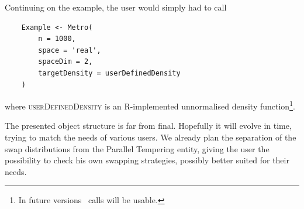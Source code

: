 Continuing on the example, the user would simply had to call

\begin{lstlisting}
	Example <- Metro(
		n = 1000,
		space = 'real',
		spaceDim = 2,
		targetDensity = userDefinedDensity
	)
\end{lstlisting}  
where \textsc{userDefinedDensity} is an R-implemented unnormalised density function\footnote{In future versions \Cpp\, calls will be usable.}.  

The presented object structure is far from final. Hopefully it will evolve in time, trying to match the needs of various users. We already plan the separation of the swap distributions from the Parallel Tempering entity, giving the user the possibility to check his own swapping strategies, possibly better suited for their needs.